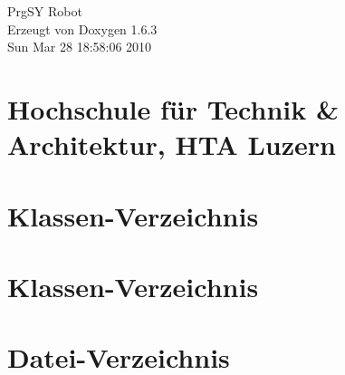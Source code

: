 \documentclass[a4paper]{book}
\begin{document}
\hypersetup{pageanchor=false}
\begin{titlepage}
\vspace*{7cm}
\begin{center}
{\Large PrgSY Robot }\\
\vspace*{1cm}
{\large Erzeugt von Doxygen 1.6.3}\\
\vspace*{0.5cm}
{\small Sun Mar 28 18:58:06 2010}\\
\end{center}
\end{titlepage}
\clearemptydoublepage
{}
\tableofcontents
\clearemptydoublepage
{}
\hypersetup{pageanchor=true}
\chapter{Hochschule f\"{u}r Technik \& Architektur, HTA Luzern}
\label{index}\hypertarget{index}{}
\chapter{Klassen-\/Verzeichnis}

\chapter{Klassen-\/Verzeichnis}

\chapter{Datei-\/Verzeichnis}

\end{document}
